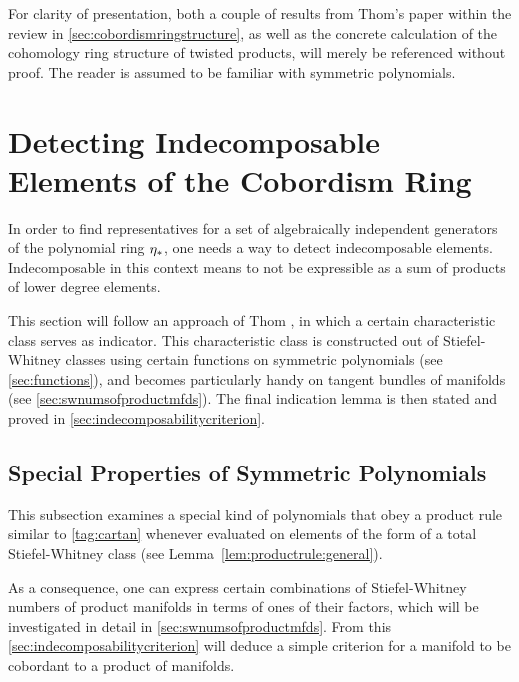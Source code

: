For clarity of presentation, both a couple of results from Thom's
paper \cite{thom} within the review in
\autoref{sec:cobordismringstructure},
as well as the concrete calculation of the cohomology ring structure
of twisted products, will merely be referenced without proof.
The reader is assumed to be familiar with symmetric polynomials.

\section{Detecting Indecomposable Elements of the Cobordism Ring}
\label{sec:indecomposableelements}
In order to find representatives for a set of algebraically
independent generators of the polynomial ring $\eta_*$, one needs a way
to detect indecomposable elements. Indecomposable in this 
context means to not be expressible as a sum of products of lower
degree elements.

This section will follow an approach of Thom 
\cite[Chapters~IV.5 and~IV.6]{thom}, in which a certain characteristic
class serves as indicator. This characteristic class is constructed
out of Stiefel-Whitney classes using certain functions on symmetric
polynomials (see \autoref{sec:functions}), and becomes particularly
handy on tangent bundles of manifolds (see
\autoref{sec:swnumsofproductmfds}). The final indication lemma is then
stated and proved in \autoref{sec:indecomposabilitycriterion}.

\subsection{Special Properties of Symmetric Polynomials}\label{sec:functions}
This subsection examines a special kind of polynomials that
obey a product rule similar to \ref{tag:cartan} whenever evaluated on
elements of the form of a total Stiefel-Whitney class
(see Lemma~\autoref{lem:productrule:general}).

As a consequence, one can express certain combinations of
Stiefel-Whitney numbers of product manifolds in terms of ones of their
factors, which will be investigated in detail in
\autoref{sec:swnumsofproductmfds}.
From this \autoref{sec:indecomposabilitycriterion} will deduce a
simple criterion for a manifold to be cobordant to a product of
manifolds.

